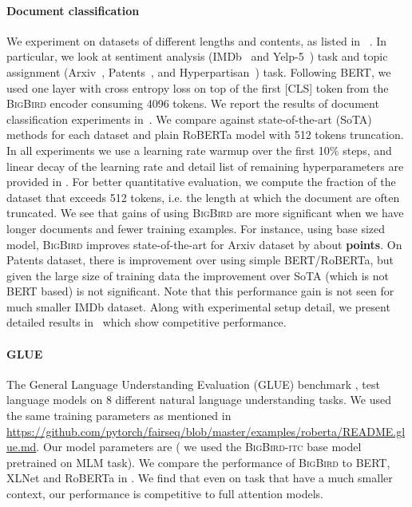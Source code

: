 \documentclass{article}
\newcommand{\bigb}{\textsc{BigBird}\xspace}
\begin{document}
\paragraph{Document classification}
We experiment on datasets of different lengths and contents,
as listed in ~.
In particular, we look at sentiment analysis (IMDb~\citep{maas2011learning} and Yelp-5~\citep{zhang2015character}) task and topic assignment (Arxiv~\citep{he2019long}, Patents~\citep{lee2020patent}, and Hyperpartisan~\citep{kiesel2019semeval}) task.
Following BERT, we used one layer with cross entropy loss on top of the first [CLS] token from the \bigb encoder consuming 4096 tokens.
We report the results of document classification experiments in~.
We compare against state-of-the-art (SoTA) methods for each dataset and plain RoBERTa model with 512 tokens truncation.
In all experiments we use a learning rate warmup over the first 10\% steps, and linear decay of the learning rate and detail list of remaining hyperparameters are provided in
.
For better quantitative evaluation, we compute the fraction of the dataset that exceeds 512 tokens, i.e. the length at which the document are often truncated.
We see that gains of using \bigb are more significant when we have longer documents and fewer training examples.
For instance, using base sized model,
\bigb improves state-of-the-art for Arxiv dataset by about  \textbf{points}.
On Patents dataset, there is improvement over using simple BERT/RoBERTa, but given the large size of training data the improvement over SoTA (which is not BERT based) is not significant.
Note that this performance gain is not seen for much
smaller IMDb dataset.
Along with experimental setup detail, we present detailed results in~ which show competitive performance.



\paragraph{GLUE}
The General Language Understanding Evaluation (GLUE) benchmark \citep{wang2018glue}, test language models on 8 different natural language understanding tasks.
We used the same training parameters as mentioned in \url{https://github.com/pytorch/fairseq/blob/master/examples/roberta/README.glue.md}. Our model parameters are  ( we used the \bigb-\textsc{itc} base model pretrained on MLM task). 
We compare the performance of \bigb to BERT, XLNet \citep{yang2019xlnet} and RoBERTa in . We find that even on task that have a much smaller context, our performance is competitive to full attention models.
\end{document}
